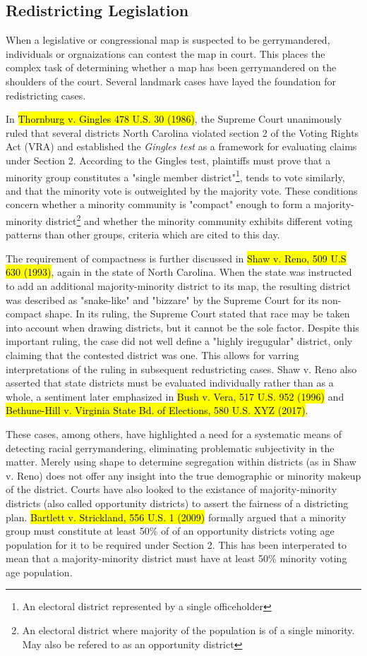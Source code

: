 \documentclass{article}
\begin{document}
\subsection{Redistricting Legislation} \label{legislation}
When a legislative or congressional map is suspected to be gerrymandered, individuals or orgnaizations can contest the map in court. This places the complex task of determining whether a map has been gerrymandered on the shoulders of the court. Several landmark cases have layed the foundation for redistricting cases. 
\par
In \hl{Thornburg v. Gingles 478 U.S. 30 (1986)}, the Supreme Court unanimously ruled that several districts North Carolina violated section 2 of the Voting Rights Act (VRA) and established the \emph{Gingles test} as a framework for evaluating claims under Section 2. According to the Gingles test, plaintiffs must prove that a minority group constitutes a "single member district"\footnote{An electoral district represented by a single officeholder }, tends to vote similarly, and that the minority vote is outweighted by the majority vote. These conditions concern whether a minority community is "compact" enough to form a majority-minority district\footnote{An electoral district where majority of the population is of a single minority. May also be refered to as an opportunity district} and whether the minority community exhibits different voting patterns than other groups, criteria which are cited to this day.
\par 
The requirement of compactness is further discussed in \hl{Shaw v. Reno, 509 U.S 630 (1993)}, again in the state of North Carolina. When the state was instructed to add an additional majority-minority district to its map, the resulting district was described as "snake-like"  and "bizzare" by the Supreme Court for its non-compact shape. In its ruling, the Supreme Court stated that race may be taken into account when drawing districts, but it cannot be the sole factor. Despite this important ruling, the case did not well define a "highly iregugular" district, only claiming that the contested district was one. This allows for varring interpretations of the ruling in subsequent redustricting cases. Shaw v. Reno also asserted that state districts must be evaluated individually rather than as a whole, a sentiment later emphasized in \hl{Bush v. Vera, 517 U.S. 952 (1996)} and \hl{Bethune-Hill v. Virginia State Bd. of Elections, 580 U.S. XYZ (2017)}.
\par
These cases, among others, have highlighted a need for a systematic means of detecting racial gerrymandering, eliminating problematic subjectivity in the matter. Merely using shape to determine segregation within districts (as in Shaw v. Reno) does not offer any insight into the true demographic or minority makeup of the district. Courts have also looked to the existance of majority-minority districts (also called opportunity districts) to assert the fairness of a districting plan. \hl{Bartlett v. Strickland, 556 U.S. 1 (2009)} formally argued that a minority group must constitute at least 50\% of of an opportunity districts voting age population for it to be required under Section 2. This has been interperated to mean that a majority-minority district must have at least 50\% minority voting age population. 
\end{document}
